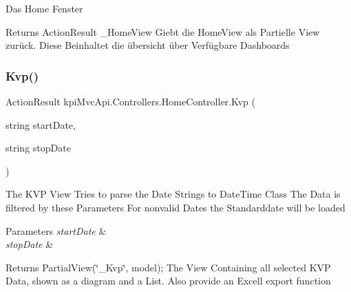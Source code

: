 Das Home Fenster 

\begin{DoxyReturn}{Returns}
{\ttfamily Action\+Result \+\_\+\+Home\+View} Giebt die Home\+View als Partielle View zurück. Diese Beinhaltet die übersicht über Verfügbare Dashboards 
\end{DoxyReturn}
\mbox{\label{classkpi_mvc_api_1_1_controllers_1_1_home_controller_aab951608121b90d9424bb58c68bd0b23}} 
\subsubsection{\texorpdfstring{Kvp()}{Kvp()}\hspace{0.1cm}{\footnotesize\ttfamily [1/2]}}
{\footnotesize\ttfamily Action\+Result kpi\+Mvc\+Api.\+Controllers.\+Home\+Controller.\+Kvp (\begin{DoxyParamCaption}\item[{string}]{start\+Date,  }\item[{string}]{stop\+Date }\end{DoxyParamCaption})\hspace{0.3cm}{\ttfamily [inline]}}



The K\+VP View Tries to parse the Date Strings to Date\+Time Class The Data is filtered by these Parameters For nonvalid Dates the Standarddate will be loaded 


\begin{DoxyParams}{Parameters}
{\em start\+Date} & \\
\hline
{\em stop\+Date} & \\
\hline
\end{DoxyParams}
\begin{DoxyReturn}{Returns}
{\ttfamily Partial\+View(\char`\"{}\+\_\+\+Kvp\char`\"{}, model);} The View Containing all selected K\+VP Data, shown as a diagram and a List. Also provide an Excell export function 
\end{DoxyReturn}
\mbox{\label{classkpi_mvc_api_1_1_controllers_1_1_home_controller_aab951608121b90d9424bb58c68bd0b23}} 
